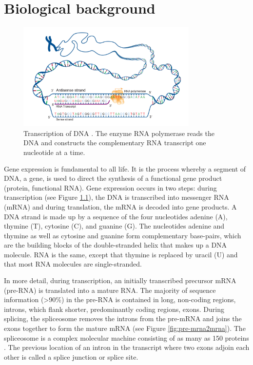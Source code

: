 \chapter{\label{ch:2-litreview}Biological background} %

\minitoc
\begin{figure}[h]
	\centering\includegraphics[width=0.8\textwidth]{../visualizations/ch2-biobackground/transcription.jpg} 
	\caption
	{Transcription of DNA \cite{img:transcription}. The enzyme RNA polymerase reads the DNA and constructs the complementary RNA transcript one nucleotide at a time. 
	}
	\label{fig:transcription}
\end{figure}


Gene expression is fundamental to all life. It is the process whereby a segment of DNA, a gene, is used to direct the synthesis of a functional gene product (protein, functional RNA). Gene expression occurs in two steps: during transcription (see Figure \ref{fig:transcription}), the DNA is transcribed into messenger RNA (mRNA) and during translation, the mRNA is decoded into gene products. A DNA strand is made up by a sequence of the four nucleotides adenine (A), thymine (T), cytosine (C), and guanine (G). The nucleotides adenine and thymine as well as cytosine and guanine form complementary base-pairs, which are the building blocks of the double-stranded helix that makes up a DNA molecule. RNA is the same, except that thymine is replaced by uracil (U) and that most RNA molecules are single-stranded.


In more detail, during transcription, an initially transcribed precursor mRNA (pre-RNA) is translated into a mature RNA. 
The majority of sequence information (>90\%) in the pre-RNA is contained in long, non-coding regions, introns, which flank shorter, predominantly coding regions, exons. 
During splicing, the spliceosome removes the introns from the pre-mRNA and joins the exons together to form the mature mRNA (see Figure \ref{fig:pre-mrna2mrna}). The spliceosome is a complex molecular machine consisting of as many as 150 proteins \cite{splicing_current_perspectives}. The previous location of an intron in the transcript where two exons adjoin each other is called a splice junction or splice site.


